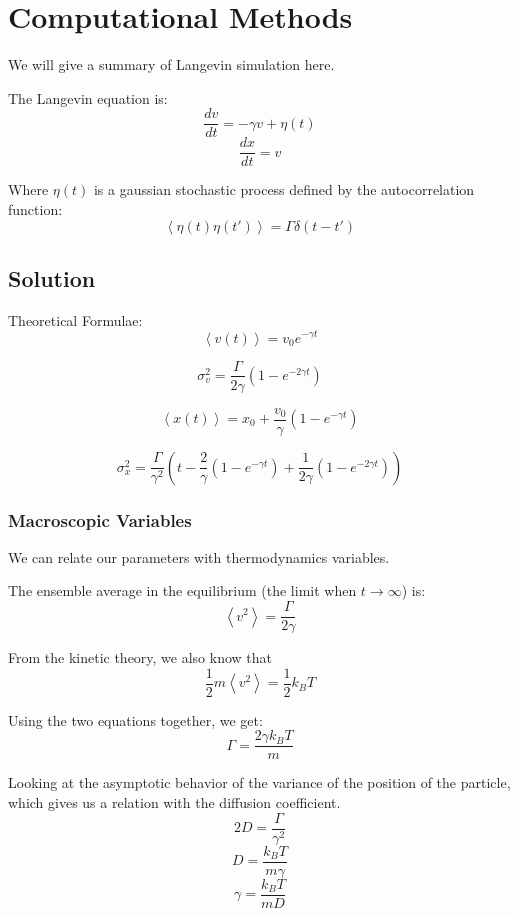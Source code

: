 
\chapter{Computational Methods}


We will give a summary of Langevin simulation here. 

The Langevin equation is:
\[
\boxed{\frac{dv}{dt} = -\gamma v + \eta\left(t\right)}
\]
$$ \frac{dx}{dt} = v $$

Where $\eta\left(t\right)$ is a gaussian stochastic process defined by the autocorrelation function:
$$ \left< \eta\left(t\right) \eta\left(t'\right)\right> = \Gamma \delta\left(t - t'\right) $$

\section{Solution} 

Theoretical Formulae:
$$ \boxed{\left<v(t)\right> = v_{0} e^{-\gamma t}} $$

$$ \boxed{\sigma_{v}^{2} = \frac{\Gamma}{2\gamma}
\left(1 - e^{-2\gamma t}\right)}$$

$$ \boxed{\left<x(t)\right> = x_{0} + \frac{v_{0}}{\gamma}\left(1 - e^{-\gamma t}\right)}$$

$$ \boxed{\sigma_{x}^{2} = \frac{\Gamma}{\gamma^{2}} \left(t - \frac{2}{\gamma}(1-e^{-\gamma t}) + \frac{1}{2\gamma}\left(1-e^{-2\gamma t}\right) \right)}$$

\subsection{Macroscopic Variables}

We can relate our parameters with thermodynamics variables.

The ensemble average in the equilibrium (the limit when $t \rightarrow \infty$) is:
$$ \left< v^{2} \right> = \frac{\Gamma}{2\gamma} $$

From the kinetic theory, we also know that
$$ \frac{1}{2} m \left< v^{2} \right> = \frac{1}{2}k_{B}T $$

Using the two equations together, we get:
$$ \boxed{\Gamma = \frac{2\gamma k_{B}T}{m}}$$

Looking at the asymptotic behavior of the variance of the position of the particle, which gives us a relation with the diffusion coefficient.
$$ 2D = \frac{\Gamma}{\gamma^2} $$
$$ D = \frac{k_{B}T}{m\gamma} $$
$$ \boxed{\gamma = \frac{k_{B}T}{mD}} $$

